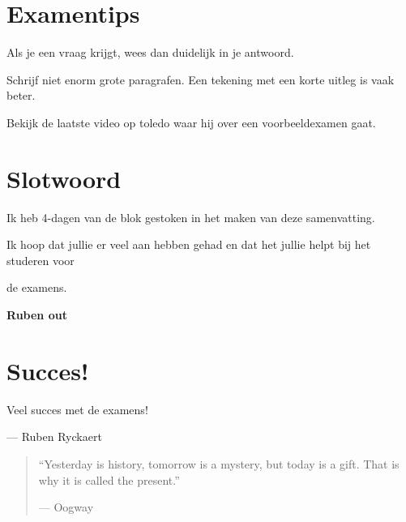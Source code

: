 \documentclass[a4paper,12pt,twoside]{report}
\begin{document}
\chapter{Examentips}

Als je een vraag krijgt, wees dan duidelijk in je antwoord.

Schrijf niet enorm grote paragrafen. Een tekening met een korte uitleg is vaak beter.

Bekijk de laatste video op toledo waar hij over een voorbeeldexamen gaat.



\chapter{Slotwoord}

Ik heb 4-dagen van de blok gestoken in het maken van deze samenvatting.

Ik hoop dat jullie er veel aan hebben gehad en dat het jullie helpt bij het studeren voor

de examens.



\textbf{Ruben out}



\newpage

\chapter*{Succes!}

\vfill

\begin{center}

	\itshape\Huge

	Veel succes met de examens!

	\par\vspace{1cm}

	\normalfont\Large

	--- Ruben Ryckaert

\end{center}



\vspace{3cm}



\begin{quote}

	\centering

	\itshape\Large

	``Yesterday is history, tomorrow is a mystery, but today is a gift. That is why it is called the present.''

	\par\vspace{0.5cm}

	\textup{--- Oogway}

\end{quote}

\vfill
\end{document}
